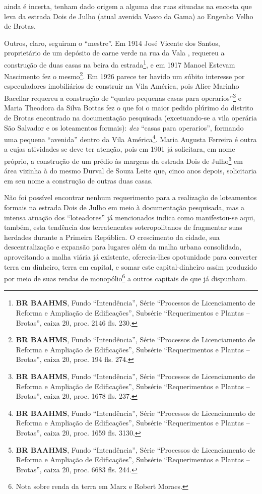 ainda é incerta, tenham dado origem a alguma das ruas situadas na encosta que leva da estrada Dois de Julho (atual avenida Vasco da Gama) ao Engenho Velho de Brotas.

Outros, claro, seguiram o ``mestre''. Em 1914 José Vicente dos Santos, proprietário de um depósito de carne verde na rua da Vala \cite[p.~402]{reis_almanak_1898}, requereu a construção de duas casas na beira da estrada\footnote{\textbf{BR BAAHMS}, Fundo ``Intendência'', Série ``Processos de Licenciamento de Reforma e Ampliação de Edificações'', Subsérie ``Requerimentos e Plantas -- Brotas'', caixa 20, proc. 2146 fls. 230.}, e em 1917 Manoel Estevam Nascimento fez o mesmo\footnote{\textbf{BR BAAHMS}, Fundo ``Intendência'', Série ``Processos de Licenciamento de Reforma e Ampliação de Edificações'', Subsérie ``Requerimentos e Plantas -- Brotas'', caixa 20, proc. 194 fls. 274.}. Em 1926 parece ter havido um súbito interesse por especuladores imobiliários de construir na Vila América, pois Alice Marinho Bacellar requereu a construção de ``quatro pequenas casas para operarios''\footnote{\textbf{BR BAAHMS}, Fundo ``Intendência'', Série ``Processos de Licenciamento de Reforma e Ampliação de Edificações'', Subsérie ``Requerimentos e Plantas -- Brotas'', caixa 20, proc. 1678 fls. 237.} e Maria Theodora da Silva Bottas fez o que foi o maior pedido plúrimo do distrito de Brotas encontrado na documentação pesquisada (excetuando-se a vila operária São Salvador e os loteamentos formais): \textit{dez} ``casas para operarios'', formando uma pequena ``avenida'' dentro da Vila América\footnote{\textbf{BR BAAHMS}, Fundo ``Intendência'', Série ``Processos de Licenciamento de Reforma e Ampliação de Edificações'', Subsérie ``Requerimentos e Plantas -- Brotas'', caixa 20, proc. 1659 fls. 3130.}. Maria Augusta Ferreira é outra a cujas atividades se deve ter atenção, pois em 1901 já solicitara, em nome próprio, a construção de um prédio às margens da estrada Dois de Julho\footnote{\textbf{BR BAAHMS}, Fundo ``Intendência'', Série ``Processos de Licenciamento de Reforma e Ampliação de Edificações'', Subsérie ``Requerimentos e Plantas -- Brotas'', caixa 20, proc. 6683 fls. 244.} em área vizinha à do mesmo Durval de Souza Leite que, cinco anos depois, solicitaria em seu nome a construção de outras duas casas.


Não foi possível encontrar nenhum requerimento para a realização de loteamentos formais na estrada Dois de Julho em meio à documentação pesquisada, mas a intensa atuação dos ``loteadores'' já mencionados indica como manifestou-se aqui, também, esta tendência dos terratenentes soteropolitanos de fragmentar suas herdades durante a Primeira República. O crescimento da cidade, sua descentralização e expansão para lugares além da malha urbana consolidada, aproveitando a malha viária já existente, oferecia-lhes opotunidade para converter terra em dinheiro, terra em capital, e somar este capital-dinheiro assim produzido por meio de suas rendas de monopólio\footnote{Nota sobre renda da terra em Marx e Robert Moraes.} a outros capitais de que já dispunham.

